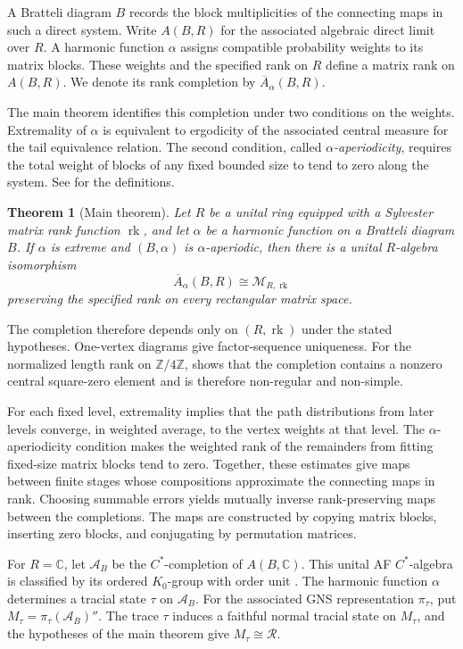 \documentclass[11pt]{amsart}
\DeclareMathOperator{\rk}{rk}
\newtheorem{theorem}{Theorem}[section]
\theoremstyle{definition}
\theoremstyle{remark}
\begin{document}
A Bratteli diagram $B$ records the block multiplicities of the connecting
maps in such a direct system.  Write $A(B,R)$ for the associated
algebraic direct limit over $R$.
A harmonic function $\alpha$ assigns compatible
probability weights to its matrix blocks.  These weights and the
specified rank on $R$ define a matrix rank on $A(B,R)$.
We denote its rank completion by $\overline A_\alpha(B,R)$.

The main theorem identifies this completion under two conditions on
the weights.  Extremality of $\alpha$ is equivalent to ergodicity of
the associated central measure for the tail equivalence relation.
The second condition, called
\emph{$\alpha$-aperiodicity}, requires the total weight of blocks of
any fixed bounded size to tend to zero along the system.
See  for the definitions.

\begin{theorem}[Main theorem]\label{thm:main}
Let $R$ be a unital ring equipped with a Sylvester matrix rank function
$\rk$, and let $\alpha$ be a harmonic function on a Bratteli diagram $B$.
If $\alpha$ is extreme and $(B,\alpha)$ is $\alpha$-aperiodic, then
there is a unital $R$-algebra isomorphism
\[
 \overline A_\alpha(B,R)\cong\mathcal M_{R,\rk}
\]
preserving the specified rank on every rectangular matrix space.
\end{theorem}

The completion therefore depends only on $(R,\rk)$ under the stated
hypotheses.
One-vertex diagrams give factor-sequence uniqueness.
For the normalized length rank on $\mathbb Z/4\mathbb Z$,
 shows that the completion contains
a nonzero central square-zero element and is therefore
non-regular and non-simple.

For each fixed level, extremality implies that the path distributions
from later levels converge, in weighted average, to the vertex weights
at that level.
The $\alpha$-aperiodicity condition makes the weighted rank of the
remainders from fitting fixed-size matrix blocks tend to zero.
Together, these estimates give maps between finite stages whose
compositions approximate the connecting maps in rank.
Choosing summable errors yields mutually inverse rank-preserving maps
between the completions.
The maps are constructed by copying matrix blocks, inserting zero
blocks, and conjugating by permutation matrices.

For $R=\mathbb C$, let $\mathcal A_B$ be the $C^*$-completion
of $A(B,\mathbb C)$.
This unital AF \(C^{*}\)-algebra is classified by its ordered $K_0$-group with
order unit \cite{Elliott1976}.
The harmonic function $\alpha$ determines a tracial state $\tau$
on $\mathcal A_B$.
For the associated GNS representation $\pi_\tau$, put
$M_\tau=\pi_\tau(\mathcal A_B)''$.
The trace $\tau$ induces a faithful normal tracial state on $M_\tau$,
and the hypotheses of the main theorem give $M_\tau\cong\mathcal R$.
\end{document}
